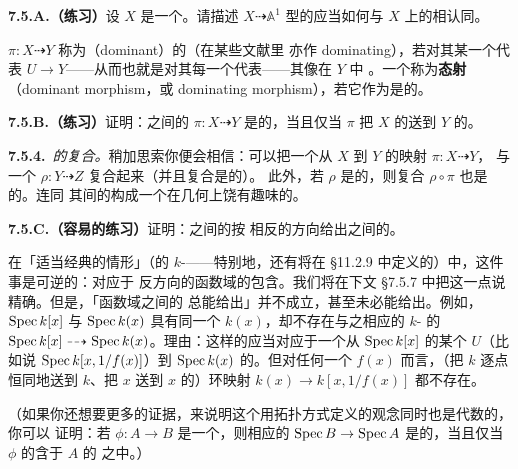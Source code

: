 \textbf{7.5.A.（练习）}\quad 设 $X$ 是一个\trReduced{}\trScheme。请描述 $X\dashrightarrow%
\mathbb{A}^1$ 型的\trRationalMap{}应当如何与 $X$ 上的\trRationalFunction{}相认同。

\trRationalMap{} $\pi\colon X\dashrightarrow Y$ 称为\textbf{\trDominant{}}（dominant）的（在某些文献里%
亦作 dominating），若对其某一个代表 $U\to Y$——从而也就是对其每一个代表——其像在 $Y$ 中%
\trDense。一个\trMorphism{}称为\textbf{\trDominant{}态射}（dominant morphism，或 dominating %
morphism），若它作为\trRationalMap{}是\trDominant{}的。

\textbf{7.5.B.（练习）}\quad 证明：\trIntegral{}\trScheme{}之间的\trRationalMap{}%
$\pi\colon X\dashrightarrow Y$ 是\trDominant{}的，当且仅当 $\pi$ 把 $X$ 的\trGenericPoint{}送到%
$Y$ 的\trGenericPoint。

\textbf{7.5.4.}\ \emph{\trRationalMap{}的复合。}\quad 稍加思索你便会相信：可以把一个从\trReduced{}%
\trScheme{} $X$ 到\trReduced{}\trScheme{} $Y$ 的\trDominant{}映射 $\pi\colon X\dashrightarrow Y$，%
与一个\trRationalMap{} $\rho\colon Y\dashrightarrow Z$ 复合起来（并且复合是\trWellDefined{}的）。%
此外，若 $\rho$ 是\trDominant{}的，则复合 $\rho\circ\pi$ 也是\trDominant{}的。\trIntegral{}\trScheme{}连同%
其间的\trDominant{}\trRationalMap{}构成一个在几何上饶有趣味的\trCategory。

\textbf{7.5.C.（容易的练习）}\quad 证明：\trIntegral{}\trScheme{}之间的\trDominant{}\trRationalMap{}按%
相反的方向给出\trFunctionField{}之间的\trMorphism。

在「适当经典的情形」（\trIntegral\trFiniteType{}的 $k$-\trScheme——特别地，还有将在%
\S11.2.9 中定义的\trIrreducible\trVariety）中，这件事是可逆的：\trDominant{}\trRationalMap{}对应于%
反方向的函数域的包含。我们将在下文 \S7.5.7 中把这一点说精确。但是，「函数域之间的%
\trMorphism{}总能给出\trDominant{}\trRationalMap{}」并不成立，甚至未必能给出\trRationalMap{}。例如，$\operatorname{Spec} k[x]$ %
与 $\operatorname{Spec} k(x)$ 具有同一个\trFunctionField{} $k(x)$，却不存在与之相应的 $k$-\trScheme{}%
的\trRationalMap{} $\operatorname{Spec} k[x]\dashrightarrow\operatorname{Spec} k(x)$。理由：这样的\trRationalMap{}应当对应于一个从%
$\operatorname{Spec} k[x]$ 的某个\trOpenSubset{} $U$（比如说 $\operatorname{Spec} k[x,1/f(x)]$）到 $\operatorname{Spec} k(x)$ %
的\trMorphism。但对任何一个 $f(x)$ 而言，（把 $k$ 逐点恒同地送到 $k$、把 $x$ 送到 $x$ %
的）环映射 $k(x)\to k[x,1/f(x)]$ 都不存在。

（如果你还想要更多的证据，来说明这个用拓扑方式定义的\trDominant{}观念同时也是代数的，你可以%
证明：若 $\phi\colon A\to B$ 是一个\trRingMorphism，则相应的\trMorphism{}%
$\operatorname{Spec} B\to\operatorname{Spec} A$ 是\trDominant{}的，当且仅当 $\phi$ 的\trKernel{}含于 $A$ 的\trNilradical{}%
之中。）

